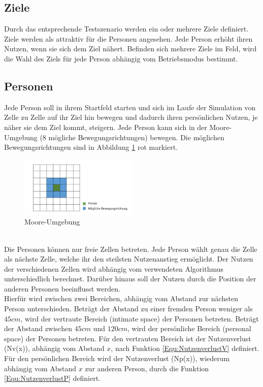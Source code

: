 \subsection{Ziele}
Durch das entsprechende Testszenario werden ein oder mehrere Ziele definiert. Ziele werden als attraktiv für die Personen angesehen. Jede Person erhöht ihren Nutzen, wenn sie sich dem Ziel nähert. Befinden sich mehrere Ziele im Feld, wird die Wahl des Ziels für jede Person abhängig vom Betriebsmodus bestimmt. 

\subsection{Personen}
\label{Anf:Personen}
Jede Person soll in ihrem Startfeld starten und sich im Laufe der Simulation von Zelle zu Zelle auf ihr Ziel hin bewegen und dadurch ihren persönlichen Nutzen, je näher sie dem Ziel kommt, steigern. Jede Person kann sich in der Moore-Umgebung (8 mögliche Bewegungsrichtungen) bewegen. Die möglichen Bewegungsrichtungen sind in Abbildung \ref{fig:MooreUmgebung} rot markiert.
\begin{figure}[htpb]
	\centering
	\includegraphics[width=0.5\textwidth]{abbildungen/MooreUmgebung.png}
	\caption{Moore-Umgebung}
	\label{fig:MooreUmgebung}
\end{figure}
\\
Die Personen können nur freie Zellen betreten. Jede Person wählt genau die Zelle als nächste Zelle, welche ihr den steilsten Nutzenanstieg ermöglicht. Der Nutzen der verschiedenen Zellen wird abhängig vom verwendeten Algorithmus unterschiedlich berechnet. Darüber hinaus soll der Nutzen durch die Position der anderen Personen beeinflusst werden. \\

Hierfür wird zwischen zwei Bereichen, abhängig vom Abstand zur nächsten Person unterschieden. Beträgt der Abstand zu einer fremden Person weniger als $45cm$, wird der vertraute Bereich (intimate space) der Personen betreten. Beträgt der Abstand zwischen $45cm$ und $120cm$, wird der persönliche Bereich (personal space) der Personen betreten. Für den vertrauten Bereich ist der Nutzenverlust (Nv(x)), abhängig vom Abstand $x$, nach Funktion \ref{Equ:NutzenverlustV} definiert. Für den persönlichen Bereich wird der Nutzenverlust (Np(x)), wiederum abhängig vom Abstand $x$ zur anderen Person, durch die Funktion \ref{Equ:NutzenverlustP} definiert. 

